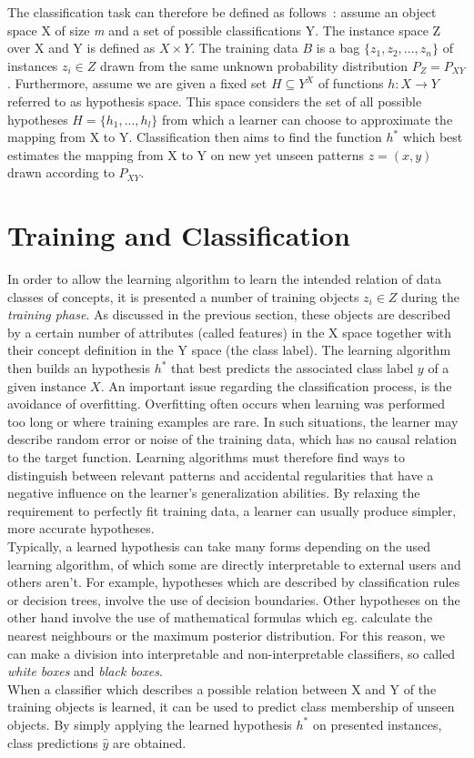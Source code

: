 \newpage 
The classification task  can therefore be defined as follows~\cite{RegionClassif08}: assume an object space X of size \textit{m} and a set of possible classifications Y. The instance space Z over X and Y is defined as \(X \times Y\). The training data \(B\) is a bag \(\lbrace z_1,z_2,...,z_n \rbrace\) of instances \(z_i \in Z\) drawn from the same unknown probability distribution \(P_Z = P_{XY}\).  Furthermore, assume we are given a fixed set \(H \subseteq Y^X\) of functions \(h:X \rightarrow Y\) referred to as hypothesis space. This space considers the set of all possible hypotheses \(H = \lbrace h_1, ..., h_l \rbrace \) from which a learner can choose to approximate the mapping from X to Y. Classification then aims to find the function \(h^*\) which best estimates the mapping from X to Y on new yet unseen patterns \(z =(x,y)\) drawn according to \(P_{XY}\). 

\section{Training and Classification}\label{classification-process}
In order to allow the learning algorithm to learn the intended relation of data classes of concepts, it is presented a number of training objects \(z_i \in Z\) during the \textit{training phase}. As discussed in the previous section, these objects are described by a certain number of attributes (called features) in the X space together with their concept definition in the Y space (the class label). The  learning algorithm then builds an hypothesis \(h^*\) that best predicts the associated class label \(y\) of a given instance \(X\). An important issue regarding the classification process, is the avoidance of overfitting. Overfitting often occurs when learning was performed too long or where training examples are rare. In such situations, the learner may describe random error or noise of the training data, which has no causal relation to the target function. Learning algorithms must therefore find ways to distinguish between relevant patterns and accidental regularities that have a negative influence on the learner’s generalization abilities. By relaxing the requirement to perfectly fit training data, a learner can usually produce simpler, more accurate hypotheses.\\
Typically, a learned hypothesis can take many forms depending on the used learning algorithm, of which some are directly interpretable to external users and others aren't.  For example, hypotheses which are described by classification rules or decision trees, involve the use of decision boundaries. Other hypotheses on the other hand involve the use of mathematical formulas which eg. calculate the nearest neighbours or the maximum posterior distribution. For this reason, we can make a division into interpretable and non-interpretable classifiers, so called \textit{white boxes} and \textit{black boxes}.\\
When a classifier which describes a possible relation between X and Y of the training objects is learned, it can be used to predict class membership of unseen objects. By simply applying the learned hypothesis \(h^*\) on presented instances, class predictions \(\widehat{y}\) are obtained.

